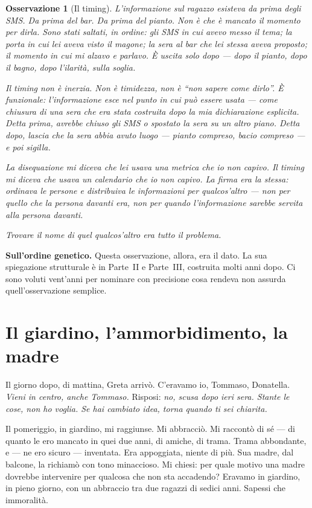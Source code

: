 \documentclass[
    oneside,                 %
    openany,                 %
    titlepage,
    11pt,
    a4paper,
    italian,
    DIV=14,                  %
    headinclude,
    footinclude=true,
    cleardoublepage=empty
]{scrbook}
\theoremstyle{ctplain}
\theoremstyle{ctdef}
\theoremstyle{ctrem}
\newtheorem*{oss}{Osservazione}
\begin{document}
\begin{oss}[Il timing]
L'informazione sul ragazzo esisteva da prima degli SMS. Da prima del bar. Da prima del pianto. Non è che è mancato il momento per dirla. Sono stati saltati, in ordine: gli SMS in cui avevo messo il tema; la porta in cui lei aveva visto il magone; la sera al bar che lei stessa aveva proposto; il momento in cui mi alzavo e parlavo. È uscita solo dopo --- dopo il pianto, dopo il bagno, dopo l'ilarità, sulla soglia.

Il timing non è inerzia. Non è timidezza, non è ``non sapere come dirlo''. È funzionale: l'informazione esce nel punto in cui può essere usata --- come chiusura di una sera che era stata costruita dopo la mia dichiarazione esplicita. Detta prima, avrebbe chiuso gli SMS o spostato la sera su un altro piano. Detta dopo, lascia che la sera abbia avuto luogo --- pianto compreso, bacio compreso --- e poi sigilla.

La disequazione mi diceva che lei usava una metrica che io non capivo. Il timing mi diceva che usava un calendario che io non capivo. La firma era la stessa: ordinava le persone e distribuiva le informazioni per qualcos'altro --- non per quello che la persona davanti era, non per quando l'informazione sarebbe servita alla persona davanti.

Trovare il nome di quel qualcos'altro era tutto il problema.
\end{oss}

\bigskip

\noindent\textbf{Sull'ordine genetico.} Questa osservazione, allora, era il dato. La sua spiegazione strutturale è in Parte~II e Parte~III, costruita molti anni dopo. Ci sono voluti vent'anni per nominare con precisione cosa rendeva non assurda quell'osservazione semplice.

\chapter[Il giardino]{Il giardino, l'ammorbidimento, la madre}

Il giorno dopo, di mattina, Greta arrivò. C'eravamo io, Tommaso, Donatella. \emph{Vieni in centro, anche Tommaso.} Risposi: \emph{no, scusa dopo ieri sera. Stante le cose, non ho voglia. Se hai cambiato idea, torna quando ti sei chiarita.}

Il pomeriggio, in giardino, mi raggiunse. Mi abbracciò. Mi raccontò di sé --- di quanto le ero mancato in quei due anni, di amiche, di trama. Trama abbondante, e --- ne ero sicuro --- inventata. Era appoggiata, niente di più. Sua madre, dal balcone, la richiamò con tono minaccioso. Mi chiesi: per quale motivo una madre dovrebbe intervenire per qualcosa che non sta accadendo? Eravamo in giardino, in pieno giorno, con un abbraccio tra due ragazzi di sedici anni. Sapessi che immoralità.
\end{document}
